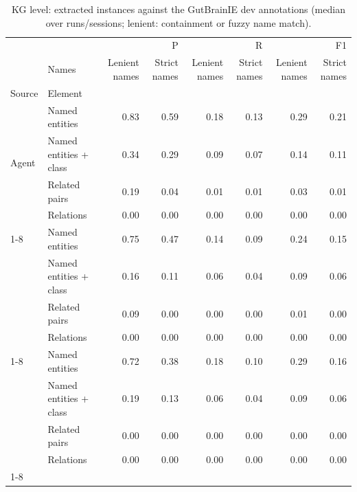 \begin{table}
\caption{KG level: extracted instances against the GutBrainIE dev annotations (median over runs/sessions; lenient: containment or fuzzy name match).}
\label{tab:onto_kg_gutbrainie}
\begin{tabular}{llrrrrrr}
\toprule
 &  & \multicolumn{2}{r}{P} & \multicolumn{2}{r}{R} & \multicolumn{2}{r}{F1} \\
 & Names & Lenient names & Strict names & Lenient names & Strict names & Lenient names & Strict names \\
Source & Element &  &  &  &  &  &  \\
\midrule
\multirow[t]{4}{*}{Agent} & Named entities & 0.83 & 0.59 & 0.18 & 0.13 & 0.29 & 0.21 \\
 & Named entities + class & 0.34 & 0.29 & 0.09 & 0.07 & 0.14 & 0.11 \\
 & Related pairs & 0.19 & 0.04 & 0.01 & 0.01 & 0.03 & 0.01 \\
 & Relations & 0.00 & 0.00 & 0.00 & 0.00 & 0.00 & 0.00 \\
\cline{1-8}
\multirow[t]{4}{*}{True ontology} & Named entities & 0.75 & 0.47 & 0.14 & 0.09 & 0.24 & 0.15 \\
 & Named entities + class & 0.16 & 0.11 & 0.06 & 0.04 & 0.09 & 0.06 \\
 & Related pairs & 0.09 & 0.00 & 0.00 & 0.00 & 0.01 & 0.00 \\
 & Relations & 0.00 & 0.00 & 0.00 & 0.00 & 0.00 & 0.00 \\
\cline{1-8}
\multirow[t]{4}{*}{Users} & Named entities & 0.72 & 0.38 & 0.18 & 0.10 & 0.29 & 0.16 \\
 & Named entities + class & 0.19 & 0.13 & 0.06 & 0.04 & 0.09 & 0.06 \\
 & Related pairs & 0.00 & 0.00 & 0.00 & 0.00 & 0.00 & 0.00 \\
 & Relations & 0.00 & 0.00 & 0.00 & 0.00 & 0.00 & 0.00 \\
\cline{1-8}
\bottomrule
\end{tabular}
\end{table}
